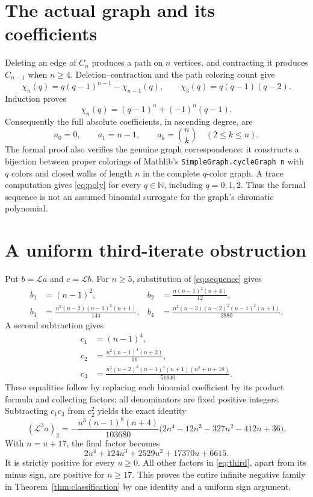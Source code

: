 \documentclass[11pt]{article}
\begin{document}
\section{The actual graph and its coefficients}
Deleting an edge of $C_n$ produces a path on $n$ vertices, and contracting
it produces $C_{n-1}$ when $n\ge4$. Deletion--contraction and the path
coloring count give
\[
 \chi_n(q)=q(q-1)^{n-1}-\chi_{n-1}(q),\qquad
 \chi_3(q)=q(q-1)(q-2).
\]
Induction proves
\begin{equation}\label{eq:poly}
 \chi_n(q)=(q-1)^n+(-1)^n(q-1).
\end{equation}
Consequently the full absolute coefficients, in ascending degree, are
\begin{equation}\label{eq:sequence}
 a_0=0,\qquad a_1=n-1,\qquad
 a_k=\binom nk\quad(2\le k\le n).
\end{equation}
The formal proof also verifies the genuine graph correspondence: it
constructs a bijection between proper colorings of Mathlib's
\texttt{SimpleGraph.cycleGraph n} with $q$ colors and closed walks of length
$n$ in the complete $q$-color graph. A trace computation gives
\eqref{eq:poly} for every $q\in\mathbb N$, including $q=0,1,2$.
Thus the formal sequence is not an assumed binomial surrogate for the
graph's chromatic polynomial.

\section{A uniform third-iterate obstruction}
Put $b=\mathcal La$ and $c=\mathcal Lb$. For $n\ge5$, substitution of
\eqref{eq:sequence} gives
\begin{align*}
b_1&=(n-1)^2,&
b_2&=\frac{n(n-1)^2(n+4)}{12},\\
b_3&=\frac{n^2(n-2)(n-1)^2(n+1)}{144},&
b_4&=\frac{n^2(n-3)(n-2)^2(n-1)^2(n+1)}{2880}.
\end{align*}
A second subtraction gives
\begin{align*}
c_1&=(n-1)^4,\\
c_2&=\frac{n^2(n-1)^4(n+2)}{16},\\
c_3&=\frac{n^3(n-2)^2(n-1)^4(n+1)(n^2+n+18)}{51840}.
\end{align*}
These equalities follow by replacing each binomial coefficient by its
product formula and collecting factors; all denominators are fixed positive
integers. Subtracting $c_1c_3$ from $c_2^2$ yields the exact identity
\begin{equation}\label{eq:third}
 (\mathcal L^3a)_2
 =-\frac{n^3(n-1)^8(n+4)}{103680}
       \bigl(2n^4-12n^3-327n^2-412n+36\bigr).
\end{equation}
With $n=u+17$, the final factor becomes
\[
 2u^4+124u^3+2529u^2+17370u+6615.
\]
It is strictly positive for every $u\ge0$. All other factors in
\eqref{eq:third}, apart from its minus sign, are positive for $n\ge17$.
This proves the entire infinite negative family in Theorem~\ref{thm:classification}
by one identity and a uniform sign argument.
\end{document}
